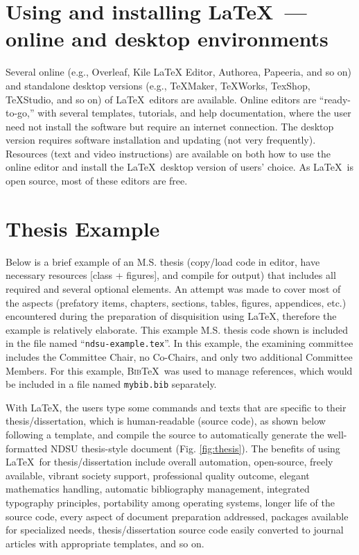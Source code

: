 \documentclass{article}
\begin{document}
\section{Using and installing \LaTeX\  --- online and desktop environments}  
Several online (e.g., Overleaf, Kile LaTeX Editor, Authorea, Papeeria, and so on) and standalone desktop versions (e.g., TeXMaker, TeXWorks, TexShop, TeXStudio, and so on) of \LaTeX\ editors are available. Online editors are ``ready-to-go,'' with several templates, tutorials, and help documentation, where the user need not install the software but require an internet connection. The desktop version requires software installation and updating (not very frequently). Resources (text and video instructions) are available on both how to use the online editor and install the \LaTeX\ desktop version of users' choice. As \LaTeX\ is open source, most of these editors are free.

\section{Thesis Example}\label{example}
Below is a brief example of an M.S. thesis (copy/load code in editor, have necessary resources [class + figures], and compile for output) that includes all required and several optional elements. An attempt was made to cover most of the aspects (prefatory items, chapters, sections, tables, figures, appendices, etc.) encountered during the preparation of disquisition using \LaTeX, therefore the example is relatively elaborate. This example M.S. thesis code shown is included in the file named ``\texttt{ndsu-example.tex}''. In this example, the examining committee includes the Committee Chair, no Co-Chairs, and only two additional Committee Members. For this example, \textsc{Bib}\TeX\ was used to manage references, which would be included in a file named \texttt{mybib.bib} separately.

With \LaTeX, the users type some commands and texts that are specific to their thesis/dissertation, which is human-readable (source code), as shown below following a template, and compile the source to automatically generate the well-formatted NDSU thesis-style document (Fig. \ref{fig:thesis}). The benefits of using \LaTeX\ for thesis/dissertation include overall automation, open-source, freely available, vibrant society support, professional quality outcome, elegant mathematics handling, automatic bibliography management, integrated typography principles, portability among operating systems, longer life of the source code, every aspect of document preparation addressed, packages available for specialized needs, thesis/dissertation source code easily converted to journal articles with appropriate templates, and so on.        
\end{document}

